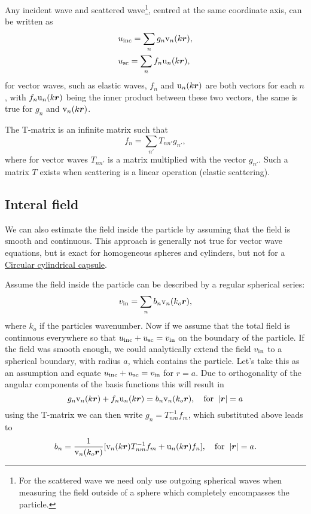 \documentclass[ 12pt, a4paper]{article}
\begin{document}
Any incident wave and scattered wave\footnote{For the scattered wave we need only use outgoing spherical waves when measuring the field outside of a sphere which completely encompasses the particle.}, centred at the same coordinate axis, can be written as
\begin{align}
  \label{eqn:incident regular expansion}
  & u_{\mathrm{inc}} = \sum_{n} g_n \mathrm v_{n}(k\boldsymbol{r}),
  \\
  & u_{\mathrm{sc}} = \sum_{n} f_n \mathrm u_{n}(k\boldsymbol{r}),
\end{align}
for vector waves, such as elastic waves, $f_n$ and $\mathrm u_{n}(k\boldsymbol{r})$ are both vectors for each $n$, with $f_n \mathrm u_{n}(k\boldsymbol{r})$ being the inner product between these two vectors, the same is true for $g_n$ and $\mathrm v_{n}(k\boldsymbol{r})$.  

The T-matrix is an infinite matrix such that
\begin{equation}
  f_n = \sum_{n'} T_{nn'} g_{n'},
\end{equation}
where for vector waves $T_{nn'}$ is a matrix multiplied with the vector $g_{n'}$.
Such a matrix $T$ exists when scattering is a linear operation (elastic scattering).

\subsection{Interal field}
We can also estimate the field inside the particle by assuming that the field is smooth and continuous. This approach is generally not true for vector wave equations, but is exact for homogeneous spheres and cylinders, but not for a \href{acoustics.pdf}{Circular cylindrical capsule}.

Assume the field inside the particle can be described by a regular spherical series:
\begin{equation}
  v_{\mathrm{in}} = \sum_n b_n \mathrm v_n(k_o \boldsymbol{r}),
\end{equation}
where $k_o$ if the particles wavenumber. Now if we assume that the total field is continuous everywhere so that $u_{\mathrm{inc}} + u_{\mathrm{sc}} = v_{\mathrm{in}}$ on the boundary of the particle. If the field was smooth enough, we could analytically extend the field $v_{\mathrm{in}}$ to a spherical boundary, with radius $a$, which contains the particle. Let's take this as an assumption and equate $u_{\mathrm{inc}} + u_{\mathrm{sc}} = v_{\mathrm{in}}$ for $r=a$. Due to orthogonality of the angular components of the basis functions this will result in
\begin{equation}
   g_n \mathrm v_{n}(k\boldsymbol{r}) + f_n \mathrm u_{n}(k\boldsymbol{r}) = b_n \mathrm v_n(k_o \boldsymbol{r}), \quad \text{for} \;\; |\boldsymbol{r}| = a
\end{equation}
using the T-matrix we can then write $g_n = T_{nm}^{-1} f_m$, which substituted above leads to
\begin{equation}
    b_n = \frac{1}{\mathrm v_n(k_o \boldsymbol{r})}[ \mathrm v_{n}(k\boldsymbol{r}) T_{nm}^{-1} f_m + \mathrm u_{n}(k\boldsymbol{r}) f_n], \quad \text{for} \;\; |\boldsymbol{r}| = a.
\end{equation}
\end{document}
